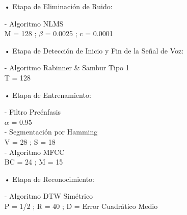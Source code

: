 \begin{enumerate}
\item[•]Etapa de Eliminación de Ruido: 
\par
\hspace*{1cm} - Algoritmo NLMS \\
\hspace*{2cm} M = 128 ; \qquad $\beta$ = 0.0025 ; \qquad c = 0.0001

\item[•]Etapa de Detección de Inicio y Fin de la Señal de Voz: 
\par
\hspace*{1cm} - Algoritmo Rabinner \& Sambur Tipo 1 \\
\hspace*{2cm} T = 128

\item[•]Etapa de Entrenamiento: 
\par
\hspace*{1cm} - Filtro Preénfasis \\
\hspace*{2cm} $\alpha$ = 0.95 \\
\hspace*{1cm} - Segmentación por Hamming \\
\hspace*{2cm} V = 28 ; \qquad S = 18 \\
\hspace*{1cm} - Algoritmo MFCC \\
\hspace*{2cm} BC = 24 ; \qquad M = 15

\item[•]Etapa de Reconocimiento: 
\par
\hspace*{1cm} - Algoritmo DTW Simétrico \\
\hspace*{2cm} P = 1/2 ; \qquad R = 40 ; \qquad D = Error Cuadrático Medio \\
\end{enumerate}

